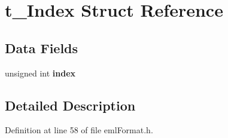\hypertarget{structt___index}{}\section{t\+\_\+\+Index Struct Reference}
\label{structt___index}
\subsection*{Data Fields}
\begin{DoxyCompactItemize}
\item 
unsigned int {\bfseries index}\hypertarget{structt___index_a07ba1c289a52127027c890d1150f9ba0}{}\label{structt___index_a07ba1c289a52127027c890d1150f9ba0}

\end{DoxyCompactItemize}


\subsection{Detailed Description}


Definition at line 58 of file eml\+Format.\+h.

